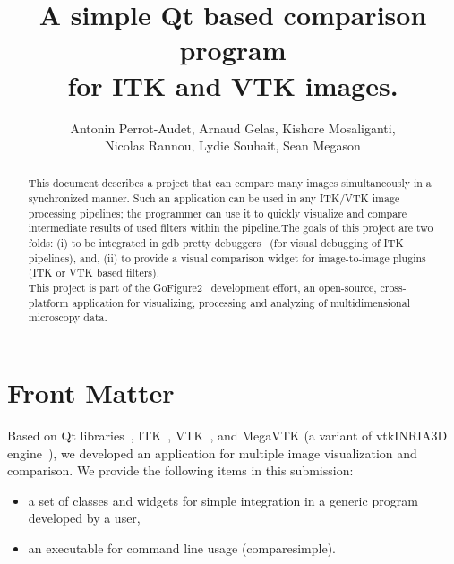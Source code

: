 \documentclass{InsightArticle}
\title{A simple Qt based comparison program\\ for ITK and VTK images.}
\author{Antonin Perrot-Audet, Arnaud Gelas, Kishore Mosaliganti,\\
Nicolas Rannou, Lydie Souhait, Sean Megason}
\newcommand{\IJhandlerIDnumber}{3196}
\begin{document}
\IJhandlefooter{\IJhandlerIDnumber}


\ifpdf
\else
\fi

\maketitle

\ifhtml
\chapter*{Front Matter\label{front}}
\fi

\begin{abstract}
\noindent
This document describes a project that can compare many images simultaneously in
a synchronized manner. Such an application can be used in any ITK/VTK image
processing pipelines; the programmer can use it to quickly visualize and compare
intermediate results of used filters within the pipeline.The goals of this
project are two folds: (i) to be integrated in gdb pretty
debuggers~\cite{McCornic-VisualDebug}  (for visual debugging of ITK pipelines),
and, (ii) to provide a visual comparison widget for image-to-image plugins (ITK
or VTK based filters).\\
This project is part of the GoFigure2~\cite{refGoFigure2} development effort, an
open-source, cross-platform application for visualizing, processing and
analyzing of multidimensional microscopy data.
\end{abstract}

\IJhandlenote{\IJhandlerIDnumber}

\tableofcontents

Based on Qt libraries~\cite{refQT}, ITK~\cite{ITKSoftwareGuide},
VTK~\cite{vtkExamples}, and MegaVTK (a variant of vtkINRIA3D
engine~\cite{vtkINRIA}), we developed an application for multiple image
visualization and comparison.
We provide the following items in this submission:
\begin{itemize}
 \item a set of classes and widgets for simple integration in a generic program developed by a user,
 \item an executable for command line usage (comparesimple).
\end{itemize} 
\end{document}
